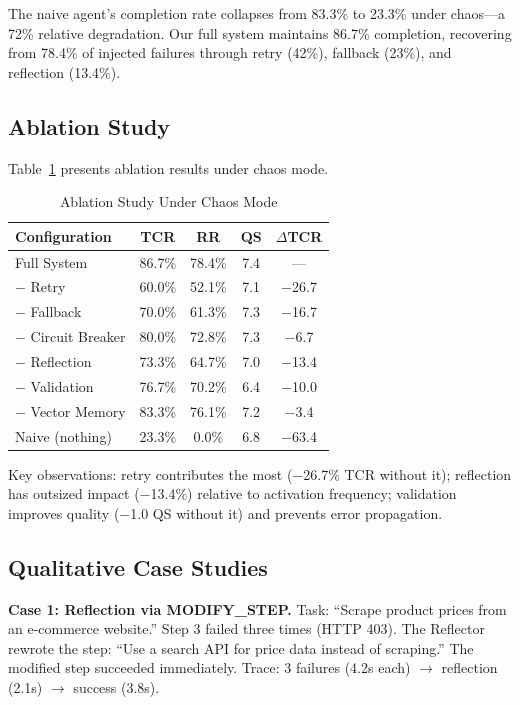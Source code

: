 \documentclass[conference]{IEEEtran}
\begin{document}
The naive agent's completion rate collapses from 83.3\% to 23.3\% under chaos---a 72\% relative degradation. Our full system maintains 86.7\% completion, recovering from 78.4\% of injected failures through retry (42\%), fallback (23\%), and reflection (13.4\%).

\subsection{Ablation Study}

Table~\ref{tab:ablation} presents ablation results under chaos mode.

\begin{table}[htbp]
    \caption{Ablation Study Under Chaos Mode}
    \label{tab:ablation}
    \centering
    \begin{tabular}{@{}lcccc@{}}
        \toprule
        \textbf{Configuration} & \textbf{TCR} & \textbf{RR} & \textbf{QS} & \textbf{$\Delta$TCR} \\
        \midrule
        Full System & 86.7\% & 78.4\% & 7.4 & --- \\
        $-$ Retry & 60.0\% & 52.1\% & 7.1 & $-$26.7 \\
        $-$ Fallback & 70.0\% & 61.3\% & 7.3 & $-$16.7 \\
        $-$ Circuit Breaker & 80.0\% & 72.8\% & 7.3 & $-$6.7 \\
        $-$ Reflection & 73.3\% & 64.7\% & 7.0 & $-$13.4 \\
        $-$ Validation & 76.7\% & 70.2\% & 6.4 & $-$10.0 \\
        $-$ Vector Memory & 83.3\% & 76.1\% & 7.2 & $-$3.4 \\
        Naive (nothing) & 23.3\% & 0.0\% & 6.8 & $-$63.4 \\
        \bottomrule
    \end{tabular}
\end{table}

Key observations: retry contributes the most ($-$26.7\% TCR without it); reflection has outsized impact ($-$13.4\%) relative to activation frequency; validation improves quality ($-$1.0 QS without it) and prevents error propagation.

\subsection{Qualitative Case Studies}

\textbf{Case 1: Reflection via MODIFY\_STEP.} Task: ``Scrape product prices from an e-commerce website.'' Step 3 failed three times (HTTP 403). The Reflector rewrote the step: ``Use a search API for price data instead of scraping.'' The modified step succeeded immediately. Trace: 3 failures (4.2s each) $\rightarrow$ reflection (2.1s) $\rightarrow$ success (3.8s).
\end{document}
